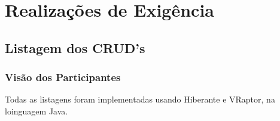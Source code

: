 \documentclass[11pt, a4paper]{article}
\begin{document}
		
		
		
		        

		
	\section{Realizações de Exigência}
        
        \subsection{Listagem dos CRUD's}
		
	        \subsubsection{Visão dos Participantes}
                Todas as listagens foram implementadas usando Hiberante e VRaptor, na loinguagem Java.
		
\end{document}
